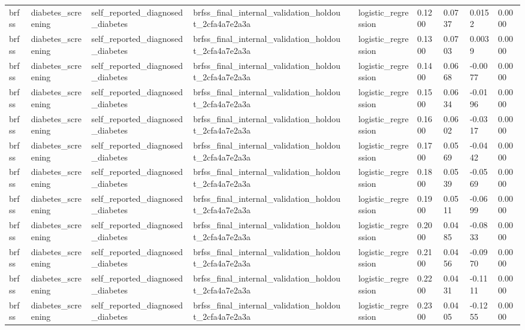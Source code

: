 \begin{tabular}{llllllllll}
brfss & diabetes\_screening & self\_reported\_diagnosed\_diabetes & brfss\_final\_internal\_validation\_holdout\_2cfa4a7e2a3a &  & logistic\_regression & 0.1200 & 0.0737 & 0.0152 & 0.0000 \\
brfss & diabetes\_screening & self\_reported\_diagnosed\_diabetes & brfss\_final\_internal\_validation\_holdout\_2cfa4a7e2a3a &  & logistic\_regression & 0.1300 & 0.0703 & 0.0039 & 0.0000 \\
brfss & diabetes\_screening & self\_reported\_diagnosed\_diabetes & brfss\_final\_internal\_validation\_holdout\_2cfa4a7e2a3a &  & logistic\_regression & 0.1400 & 0.0668 & -0.0077 & 0.0000 \\
brfss & diabetes\_screening & self\_reported\_diagnosed\_diabetes & brfss\_final\_internal\_validation\_holdout\_2cfa4a7e2a3a &  & logistic\_regression & 0.1500 & 0.0634 & -0.0196 & 0.0000 \\
brfss & diabetes\_screening & self\_reported\_diagnosed\_diabetes & brfss\_final\_internal\_validation\_holdout\_2cfa4a7e2a3a &  & logistic\_regression & 0.1600 & 0.0602 & -0.0317 & 0.0000 \\
brfss & diabetes\_screening & self\_reported\_diagnosed\_diabetes & brfss\_final\_internal\_validation\_holdout\_2cfa4a7e2a3a &  & logistic\_regression & 0.1700 & 0.0569 & -0.0442 & 0.0000 \\
brfss & diabetes\_screening & self\_reported\_diagnosed\_diabetes & brfss\_final\_internal\_validation\_holdout\_2cfa4a7e2a3a &  & logistic\_regression & 0.1800 & 0.0539 & -0.0569 & 0.0000 \\
brfss & diabetes\_screening & self\_reported\_diagnosed\_diabetes & brfss\_final\_internal\_validation\_holdout\_2cfa4a7e2a3a &  & logistic\_regression & 0.1900 & 0.0511 & -0.0699 & 0.0000 \\
brfss & diabetes\_screening & self\_reported\_diagnosed\_diabetes & brfss\_final\_internal\_validation\_holdout\_2cfa4a7e2a3a &  & logistic\_regression & 0.2000 & 0.0485 & -0.0833 & 0.0000 \\
brfss & diabetes\_screening & self\_reported\_diagnosed\_diabetes & brfss\_final\_internal\_validation\_holdout\_2cfa4a7e2a3a &  & logistic\_regression & 0.2100 & 0.0456 & -0.0970 & 0.0000 \\
brfss & diabetes\_screening & self\_reported\_diagnosed\_diabetes & brfss\_final\_internal\_validation\_holdout\_2cfa4a7e2a3a &  & logistic\_regression & 0.2200 & 0.0431 & -0.1111 & 0.0000 \\
brfss & diabetes\_screening & self\_reported\_diagnosed\_diabetes & brfss\_final\_internal\_validation\_holdout\_2cfa4a7e2a3a &  & logistic\_regression & 0.2300 & 0.0405 & -0.1255 & 0.0000 \\

\end{tabular}
